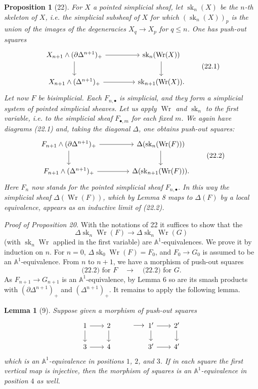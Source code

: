 \documentclass[11pt]{article}
\newcommand{\Aone}{\mathbb A^1}
\theoremstyle{deligne}
\newtheorem*{proposition*}{Proposition}
\newtheorem*{lemma*}{Lemma}
\newenvironment{proofnamed}[1]{\noindent\textit{#1.}}{}
\newcommand{\sk}{\operatorname{sk}}
\newcommand{\Wr}{\operatorname{Wr}}
\begin{document}
\begin{proposition*}[22]
For \(X\) a pointed simplicial sheaf, let \(\sk_n(X)\) be the \(n\)-th skeleton of \(X\), i.e. the simplicial subsheaf of \(X\) for which \((\sk_n(X))_p\) is the union of the images of the degeneracies \(X_q\to X_p\) for \(q\le n\). One has push-out squares
\[
\begin{tikzcd}[column sep=4.2em,row sep=2.0em]
X_{n+1}\wedge(\partial\Delta^{n+1})_+ \arrow[r] \arrow[d] & \sk_n(\Wr(X)) \arrow[d] \\
X_{n+1}\wedge(\Delta^{n+1})_+ \arrow[r] & \sk_{n+1}(\Wr(X)).
\end{tikzcd}
\tag{22.1}
\]
Let now \(F\) be bisimplicial. Each \(F_{n,\bullet}\) is simplicial, and they form a simplicial system of pointed simplicial sheaves. Let us apply \(\Wr\) and \(\sk_n\) to the first variable, i.e. to the simplicial sheaf \(F_{\bullet,m}\) for each fixed \(m\). We again have diagrams (22.1) and, taking the diagonal \(\Delta\), one obtains push-out squares:
\[
\begin{tikzcd}[column sep=4.2em,row sep=2.0em]
F_{n+1}\wedge(\partial\Delta^{n+1})_+ \arrow[r] \arrow[d] & \Delta(\sk_n(\Wr(F))) \arrow[d] \\
F_{n+1}\wedge(\Delta^{n+1})_+ \arrow[r] & \Delta(\sk_{n+1}(\Wr(F))).
\end{tikzcd}
\tag{22.2}
\]
Here \(F_n\) now stands for the pointed simplicial sheaf \(F_{n,\bullet}\). In this way the simplicial sheaf \(\Delta(\Wr(F))\), which by Lemma 8 maps to \(\Delta(F)\) by a local equivalence, appears as an inductive limit of (22.2).
\end{proposition*}

\begin{proofnamed}{Proof of Proposition 20}
With the notations of 22 it suffices to show that the
\[
\Delta\sk_n\Wr(F)\longrightarrow\Delta\sk_n\Wr(G)
\]
(with \(\sk_n\Wr\) applied in the first variable) are \(\Aone\)-equivalences. We prove it by induction on \(n\). For \(n=0\), \(\Delta\sk_0\Wr(F)=F_0\), and \(F_0\to G_0\) is assumed to be an \(\Aone\)-equivalence. From \(n\) to \(n+1\), we have a morphism of push-out squares
\[
\text{(22.2) for }F\quad\longrightarrow\quad\text{(22.2) for }G.
\]
As \(F_{n+1}\to G_{n+1}\) is an \(\Aone\)-equivalence, by Lemma 6 so are its smash products with \((\partial\Delta^{n+1})_+\) and \((\Delta^{n+1})_+\). It remains to apply the following lemma.
\end{proofnamed}

\begin{lemma*}[9]
Suppose given a morphism of push-out squares
\[
\begin{tikzcd}[column sep=2.0em,row sep=1.5em]
1 \arrow[r] \arrow[d] & 2 \arrow[d]
&[-0.2em] \arrow[r,phantom,"\longrightarrow"] &[-0.2em]
1' \arrow[r] \arrow[d] & 2' \arrow[d] \\
3 \arrow[r] & 4 && 3' \arrow[r] & 4'
\end{tikzcd}
\]
which is an \(\Aone\)-equivalence in positions \(1\), \(2\), and \(3\). If in each square the first vertical map is injective, then the morphism of squares is an \(\Aone\)-equivalence in position \(4\) as well.
\end{lemma*}
\end{document}

